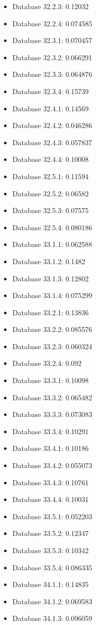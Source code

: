 \begin{itemize}
\item Database 32.2.3: 0.12032
\item Database 32.2.4: 0.074585
\item Database 32.3.1: 0.070457
\item Database 32.3.2: 0.066291
\item Database 32.3.3: 0.064876
\item Database 32.3.4: 0.15739
\item Database 32.4.1: 0.14569
\item Database 32.4.2: 0.046286
\item Database 32.4.3: 0.057837
\item Database 32.4.4: 0.10008
\item Database 32.5.1: 0.11594
\item Database 32.5.2: 0.06582
\item Database 32.5.3: 0.07575
\item Database 32.5.4: 0.080186
\item Database 33.1.1: 0.062588
\item Database 33.1.2: 0.1482
\item Database 33.1.3: 0.12802
\item Database 33.1.4: 0.075299
\item Database 33.2.1: 0.13836
\item Database 33.2.2: 0.085576
\item Database 33.2.3: 0.060324
\item Database 33.2.4: 0.092
\item Database 33.3.1: 0.10098
\item Database 33.3.2: 0.065482
\item Database 33.3.3: 0.073083
\item Database 33.3.4: 0.10291
\item Database 33.4.1: 0.10186
\item Database 33.4.2: 0.055073
\item Database 33.4.3: 0.10761
\item Database 33.4.4: 0.10031
\item Database 33.5.1: 0.052203
\item Database 33.5.2: 0.12347
\item Database 33.5.3: 0.10342
\item Database 33.5.4: 0.086335
\item Database 34.1.1: 0.14835
\item Database 34.1.2: 0.069583
\item Database 34.1.3: 0.096059

\end{itemize}
